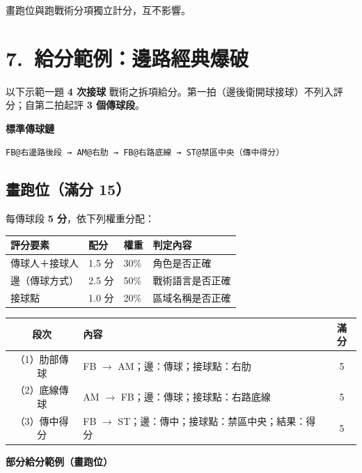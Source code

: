 \documentclass[11pt]{article}
\newcommand{\term}[1]{\textbf{#1}}
\begin{document}
\vspace{0.4em}
\noindent
畫跑位與跑戰術分項獨立計分，互不影響。

\section*{7.\ 給分範例：邊路經典爆破}

以下示範一題 \term{4 次接球} 戰術之拆項給分。第一拍（邊後衛開球接球）不列入評分；自第二拍起評 \term{3 個傳球段}。

\vspace{0.4em}
\noindent\textbf{標準傳球鏈}

\begin{verbatim}
FB@右邊路後段 → AM@右肋 → FB@右路底線 → ST@禁區中央（傳中得分）
\end{verbatim}

\subsection*{畫跑位（滿分 15）}

每傳球段 \term{5 分}，依下列權重分配：

\vspace{0.3em}
\small
\begin{tabular}{@{}llll@{}}
\toprule
\textbf{評分要素} & \textbf{配分} & \textbf{權重} & \textbf{判定內容} \\
\midrule
傳球人＋接球人 & 1.5 分 & 30\% & 角色是否正確 \\
邊（傳球方式） & 2.5 分 & 50\% & 戰術語言是否正確 \\
接球點 & 1.0 分 & 20\% & 區域名稱是否正確 \\
\bottomrule
\end{tabular}
\normalsize

\vspace{0.5em}
\begin{tabular}{@{}clc@{}}
\toprule
\textbf{段次} & \textbf{內容} & \textbf{滿分} \\
\midrule
（1）肋部傳球 & FB $\rightarrow$ AM；邊：傳球；接球點：右肋 & 5 \\
（2）底線傳球 & AM $\rightarrow$ FB；邊：傳球；接球點：右路底線 & 5 \\
（3）傳中得分 & FB $\rightarrow$ ST；邊：傳中；接球點：禁區中央；結果：得分 & 5 \\
\bottomrule
\end{tabular}

\vspace{0.6em}
\noindent\textbf{部分給分範例（畫跑位）}
\end{document}
